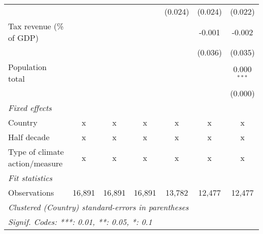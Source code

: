 \begin{tabular}{lcccccc}
                                                                      &         &             &         & (0.024)       & (0.024)       & (0.022)\\   
   Tax revenue (\% of GDP)                                            &         &             &         &               & -0.001        & -0.002\\   
                                                                      &         &             &         &               & (0.036)       & (0.035)\\   
   Population total                                                   &         &             &         &               &               & 0.000$^{***}$\\   
                                                                      &         &             &         &               &               & (0.000)\\   
   \emph{Fixed effects}\\
   Country                                                            & x       & x           & x       & x             & x             & x\\  
   Half decade                                                        & x       & x           & x       & x             & x             & x\\  
   Type of climate action/measure                                     & x       & x           & x       & x             & x             & x\\  
   \midrule \emph{Fit statistics}\\
   Observations                                                       & 16,891  & 16,891      & 16,891  & 13,782        & 12,477        & 12,477\\  
   \midrule
   \multicolumn{7}{l}{\emph{Clustered (Country) standard-errors in parentheses}}\\
   \multicolumn{7}{l}{\emph{Signif. Codes: ***: 0.01, **: 0.05, *: 0.1}}\\
\end{tabular}
\par\endgroup


